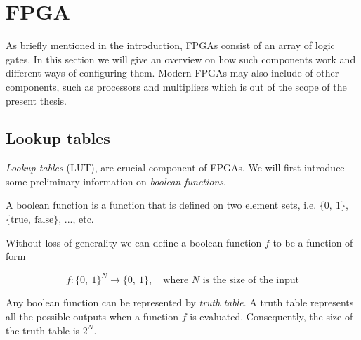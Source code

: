 \chapter{FPGA\label{FPGA}}
As briefly mentioned in the introduction, FPGAs consist of an array of logic
gates. In this section we will give an overview on how such components work and
different ways of configuring them. Modern FPGAs may also include of other
components, such as processors and multipliers which is out of the scope of
the present thesis.



\section{Lookup tables}

\textit{Lookup tables} (LUT), are crucial component of FPGAs. We will first
introduce some preliminary information on \textit{boolean functions}.

\begin{definition}
    A boolean function is a function that is defined on two element sets, i.e.
    $\{0,\ 1\}$, $\{\text{true},\ \text{false}\}$, ..., etc.

    Without loss of generality we can define a boolean function $f$ to be a
    function of form

    \[f \colon \{0,\ 1\}^N \rightarrow \{0,\ 1\}, \quad \text{where $N$ is the
    size of the input}\]

    Any boolean function can be represented by \textit{truth table}. A truth
    table represents all the possible outputs when a function $f$ is evaluated.
    Consequently, the size of the truth table is $2^N$.
\end{definition}


